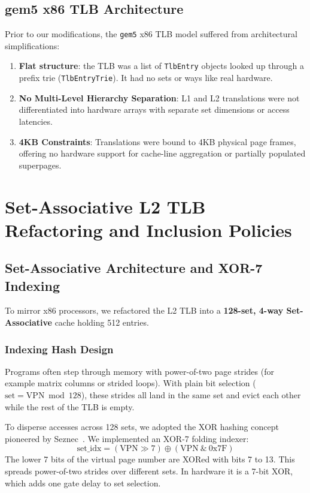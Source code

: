 \subsection{gem5 x86 TLB Architecture}
Prior to our modifications, the \texttt{gem5} x86 TLB model suffered from architectural simplifications:
\begin{enumerate}
    \item \textbf{Flat structure}: the TLB was a list of \texttt{TlbEntry} objects looked up through a prefix trie (\texttt{TlbEntryTrie}). It had no sets or ways like real hardware.
    \item \textbf{No Multi-Level Hierarchy Separation}: L1 and L2 translations were not differentiated into hardware arrays with separate set dimensions or access latencies.
    \item \textbf{4KB Constraints}: Translations were bound to 4KB physical page frames, offering no hardware support for cache-line aggregation or partially populated superpages.
\end{enumerate}

\section{Set-Associative L2 TLB Refactoring and Inclusion Policies}

\subsection{Set-Associative Architecture and XOR-7 Indexing}
To mirror x86 processors, we refactored the L2 TLB into a \textbf{128-set, 4-way Set-Associative} cache holding 512 entries.

\subsubsection{Indexing Hash Design}
Programs often step through memory with power-of-two page strides (for example matrix columns or strided loops). With plain bit selection ($\text{set} = \text{VPN} \bmod 128$), these strides all land in the same set and evict each other while the rest of the TLB is empty.

To disperse accesses across 128 sets, we adopted the XOR hashing concept pioneered by Seznec~\cite{seznec1993skewed}. We implemented an XOR-7 folding indexer:
\begin{equation}
    \text{set\_idx} = \left(\text{VPN} \gg 7\right) \oplus \left(\text{VPN} \ \& \ \text{0x7F}\right)
\end{equation}
The lower 7 bits of the virtual page number are XORed with bits 7 to 13. This spreads power-of-two strides over different sets. In hardware it is a 7-bit XOR, which adds one gate delay to set selection.

